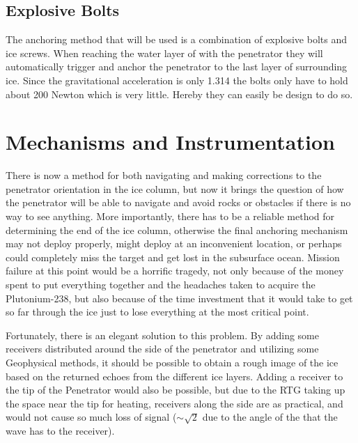 

\subsection{Explosive Bolts}
The anchoring method that will be used is a combination of explosive bolts and ice screws. When reaching the water layer of with the penetrator they will automatically trigger and anchor the penetrator to the last layer of surrounding ice. Since the gravitational acceleration is only 1.314 the bolts only have to hold about 200 Newton which is very little. Hereby they can easily be design to do so.

\section{Mechanisms and Instrumentation}



There is now a method for both navigating and making corrections to the penetrator orientation in the ice column, but now it brings the question of how the penetrator will be able to navigate and avoid rocks or obstacles if there is no way to see anything. More importantly, there has to be a reliable method for determining the end of the ice column, otherwise the final anchoring mechanism may not deploy properly, might deploy at an inconvenient location, or perhaps could completely miss the target and get lost in the subsurface ocean. Mission failure at this point would be a horrific tragedy, not only because of the money spent to put everything together and the headaches taken to acquire the Plutonium-238, but also because of the time investment that it would take to get so far through the ice just to lose everything at the most critical point.

Fortunately, there is an elegant solution to this problem. By adding some receivers distributed around the side of the penetrator and utilizing some Geophysical methods, it should be possible to obtain a rough image of the ice based on the returned echoes from the different ice layers. Adding a receiver to the tip of the Penetrator would also be possible, but due to the RTG taking up the space near the tip for heating, receivers along the side are as practical, and would not cause so much loss of signal ($\sim \sqrt{2}$ due to the angle of the that the wave has to the receiver).

